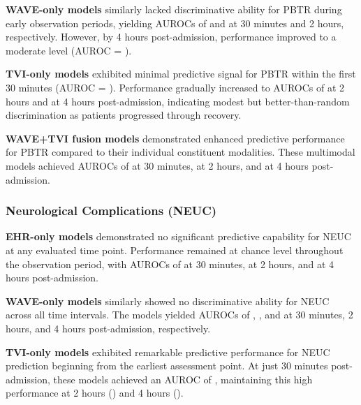\vspace{1ex}
\noindent\textbf{WAVE-only models} similarly lacked discriminative ability for PBTR during early observation periods, yielding AUROCs of  and  at 30 minutes and 2 hours, respectively. However, by 4 hours post-admission, performance improved to a moderate level (AUROC = ).

\vspace{1ex}
\noindent\textbf{TVI-only models} exhibited minimal predictive signal for PBTR within the first 30 minutes (AUROC = ). Performance gradually increased to AUROCs of  at 2 hours and  at 4 hours post-admission, indicating modest but better-than-random discrimination as patients progressed through recovery.

\vspace{1ex}
\noindent\textbf{WAVE+TVI fusion models} demonstrated enhanced predictive performance for PBTR compared to their individual constituent modalities. These multimodal models achieved AUROCs of  at 30 minutes,  at 2 hours, and  at 4 hours post-admission.

\subsubsection*{Neurological Complications (NEUC)}

\vspace{1ex}
\noindent\textbf{EHR-only models} demonstrated no significant predictive capability for NEUC at any evaluated time point. Performance remained at chance level throughout the observation period, with AUROCs of  at 30 minutes,  at 2 hours, and  at 4 hours post-admission.

\vspace{1ex}
\noindent\textbf{WAVE-only models} similarly showed no discriminative ability for NEUC across all time intervals. The models yielded AUROCs of , , and  at 30 minutes, 2 hours, and 4 hours post-admission, respectively.

\vspace{1ex}
\noindent\textbf{TVI-only models} exhibited remarkable predictive performance for NEUC prediction beginning from the earliest assessment point. At just 30 minutes post-admission, these models achieved an AUROC of , maintaining this high performance at 2 hours () and 4 hours ().

